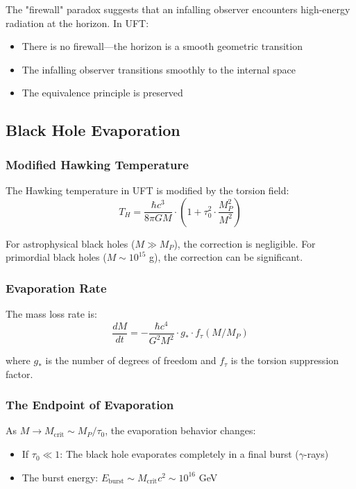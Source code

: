 The "firewall" paradox suggests that an infalling observer encounters high-energy radiation at the horizon. In UFT:
\begin{itemize}
    \item There is no firewall—the horizon is a smooth geometric transition
    \item The infalling observer transitions smoothly to the internal space
    \item The equivalence principle is preserved
\end{itemize}

\subsection{Black Hole Evaporation}

\subsubsection{Modified Hawking Temperature}

The Hawking temperature in UFT is modified by the torsion field:
\begin{equation}
    T_H = \frac{\hbar c^3}{8\pi G M} \cdot \left(1 + \tau_0^2 \cdot \frac{M_P^2}{M^2}\right)
\end{equation}

For astrophysical black holes ($M \gg M_P$), the correction is negligible. For primordial black holes ($M \sim 10^{15}$ g), the correction can be significant.

\subsubsection{Evaporation Rate}

The mass loss rate is:
\begin{equation}
    \frac{dM}{dt} = -\frac{\hbar c^4}{G^2 M^2} \cdot g_* \cdot f_\tau(M/M_P)
\end{equation}

where $g_*$ is the number of degrees of freedom and $f_\tau$ is the torsion suppression factor.

\subsubsection{The Endpoint of Evaporation}

\begin{theorem}
As $M \to M_{\text{crit}} \sim M_P/\tau_0$, the evaporation behavior changes:
\begin{itemize}
    \item If $\tau_0 \ll 1$: The black hole evaporates completely in a final burst ($\gamma$-rays)
    \item The burst energy: $E_{\text{burst}} \sim M_{\text{crit}} c^2 \sim 10^{16}$ GeV
\end{itemize}
\end{theorem}

